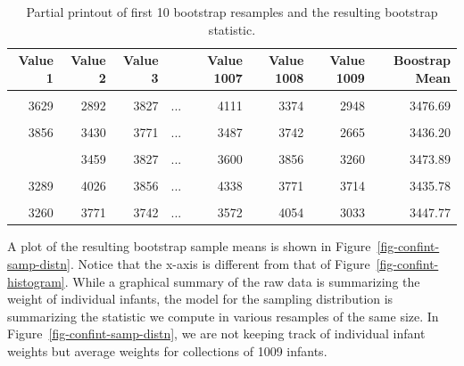 \documentclass[
  letterpaper,
  DIV=11,
  numbers=noendperiod]{scrreprt}
\theoremstyle{definition}
\theoremstyle{definition}
\theoremstyle{plain}
\theoremstyle{remark}
\begin{document}
\hypertarget{tbl-confint-bootstrap}{}
\begin{table}
\caption{\label{tbl-confint-bootstrap}Partial printout of first 10 bootstrap resamples and the resulting
bootstrap statistic. }\tabularnewline

\centering
\begin{tabular}[t]{rrrlrrrr}
\toprule
Value 1 & Value 2 & Value 3 &         & Value 1007 & Value 1008 & Value 1009 & Boostrap Mean\\
\midrule
\cellcolor{gray!6}{3345} & \cellcolor{gray!6}{3572} & \cellcolor{gray!6}{3572} & \cellcolor{gray!6}{...} & \cellcolor{gray!6}{3827} & \cellcolor{gray!6}{3827} & \cellcolor{gray!6}{3119} & \cellcolor{gray!6}{3461.89}\\
3629 & 2892 & 3827 & ... & 4111 & 3374 & 2948 & 3476.69\\
\cellcolor{gray!6}{2495} & \cellcolor{gray!6}{3686} & \cellcolor{gray!6}{3827} & \cellcolor{gray!6}{...} & \cellcolor{gray!6}{3289} & \cellcolor{gray!6}{3544} & \cellcolor{gray!6}{3487} & \cellcolor{gray!6}{3428.90}\\
3856 & 3430 & 3771 & ... & 3487 & 3742 & 2665 & 3436.20\\
\cellcolor{gray!6}{3430} & \cellcolor{gray!6}{3119} & \cellcolor{gray!6}{4479} & \cellcolor{gray!6}{...} & \cellcolor{gray!6}{3686} & \cellcolor{gray!6}{3090} & \cellcolor{gray!6}{3005} & \cellcolor{gray!6}{3451.09}\\
\addlinespace
3289 & 3459 & 3827 & ... & 3600 & 3856 & 3260 & 3473.89\\
\cellcolor{gray!6}{2863} & \cellcolor{gray!6}{3345} & \cellcolor{gray!6}{3232} & \cellcolor{gray!6}{...} & \cellcolor{gray!6}{3345} & \cellcolor{gray!6}{3544} & \cellcolor{gray!6}{2948} & \cellcolor{gray!6}{3427.89}\\
3289 & 4026 & 3856 & ... & 4338 & 3771 & 3714 & 3435.78\\
\cellcolor{gray!6}{3175} & \cellcolor{gray!6}{3544} & \cellcolor{gray!6}{3771} & \cellcolor{gray!6}{...} & \cellcolor{gray!6}{3572} & \cellcolor{gray!6}{3515} & \cellcolor{gray!6}{3005} & \cellcolor{gray!6}{3419.37}\\
3260 & 3771 & 3742 & ... & 3572 & 4054 & 3033 & 3447.77\\
\bottomrule
\end{tabular}
\end{table}

A plot of the resulting bootstrap sample means is shown in
Figure~\ref{fig-confint-samp-distn}. Notice that the x-axis is different
from that of Figure~\ref{fig-confint-histogram}. While a graphical
summary of the raw data is summarizing the weight of individual infants,
the model for the sampling distribution is summarizing the statistic we
compute in various resamples of the same size. In
Figure~\ref{fig-confint-samp-distn}, we are not keeping track of
individual infant weights but average weights for collections of 1009
infants.
\end{document}
